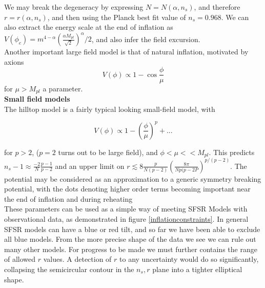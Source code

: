 \documentclass[a4paper,10pt]{article}
\newcommand{\Mp}{M_{pl}}
\begin{document}
We may break the degeneracy by expressing  $N=N(\alpha, n_s)$, and therefore $r=r(\alpha, n_s)$, and then using the Planck best fit value of $n_s=0.968$. We can also extract the energy scale at the end of inflation as  $V(\phi_e)=m^{4-\alpha}(\frac{\alpha\Mp}{\sqrt{2}})^\alpha/2$, and also infer the field excursion.\\

Another important large field model is that of natural inflation, motivated by axions
\begin{equation}
V(\phi) \propto 1-\cos\frac{\phi}{\mu}
\end{equation}
for $\mu>\Mp$ a parameter.\\

\textbf{Small field models} \\

The hilltop model is a fairly typical looking small-field model, with

\begin{equation}
V(\phi) \propto 1-\left(\frac{\phi}{\mu}\right)^p + ... 
\end{equation}

for $p>2$, ($p=2$ turns out to be large field), and $\phi<\mu<<\Mp$. This predicts $n_s-1 \approx \frac{-2}{N}\frac{p-1}{p-2}$ and an upper limit on $r\lesssim 8\frac{p}{N(p-2)}(\frac{8\pi}{Np(p-2P})^{p/(p-2)}$. The potential may be considered as an approximation to a generic symmetry breaking potential, with the dots denoting higher order terms becoming important near the end of inflation and during reheating \\

These parameters can be used as a simple way of meeting SFSR Models with observational data, as demonstrated in figure \ref{inflationconstraints}. In general SFSR models can have a blue or red tilt, and so far we have been able to exclude all blue models. From the more precise shape of the data we see we can rule out many other models. For progress to be made we must further contains the range of allowed $r$ values. A detection of $r$ to any uncertainty would do so significantly, collapsing the semicircular contour in the $n_s,r$ plane into a tighter elliptical shape.
\end{document}
